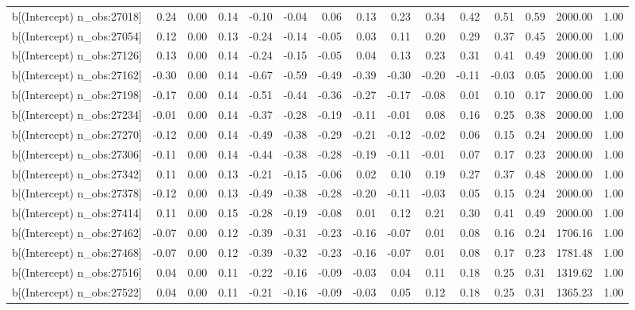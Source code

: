 \begin{table}[ht]
\begin{tabular}{rrrrrrrrrrrrrrr}
  b[(Intercept) n\_obs:27018] & 0.24 & 0.00 & 0.14 & -0.10 & -0.04 & 0.06 & 0.13 & 0.23 & 0.34 & 0.42 & 0.51 & 0.59 & 2000.00 & 1.00 \\ 
  b[(Intercept) n\_obs:27054] & 0.12 & 0.00 & 0.13 & -0.24 & -0.14 & -0.05 & 0.03 & 0.11 & 0.20 & 0.29 & 0.37 & 0.45 & 2000.00 & 1.00 \\ 
  b[(Intercept) n\_obs:27126] & 0.13 & 0.00 & 0.14 & -0.24 & -0.15 & -0.05 & 0.04 & 0.13 & 0.23 & 0.31 & 0.41 & 0.49 & 2000.00 & 1.00 \\ 
  b[(Intercept) n\_obs:27162] & -0.30 & 0.00 & 0.14 & -0.67 & -0.59 & -0.49 & -0.39 & -0.30 & -0.20 & -0.11 & -0.03 & 0.05 & 2000.00 & 1.00 \\ 
  b[(Intercept) n\_obs:27198] & -0.17 & 0.00 & 0.14 & -0.51 & -0.44 & -0.36 & -0.27 & -0.17 & -0.08 & 0.01 & 0.10 & 0.17 & 2000.00 & 1.00 \\ 
  b[(Intercept) n\_obs:27234] & -0.01 & 0.00 & 0.14 & -0.37 & -0.28 & -0.19 & -0.11 & -0.01 & 0.08 & 0.16 & 0.25 & 0.38 & 2000.00 & 1.00 \\ 
  b[(Intercept) n\_obs:27270] & -0.12 & 0.00 & 0.14 & -0.49 & -0.38 & -0.29 & -0.21 & -0.12 & -0.02 & 0.06 & 0.15 & 0.24 & 2000.00 & 1.00 \\ 
  b[(Intercept) n\_obs:27306] & -0.11 & 0.00 & 0.14 & -0.44 & -0.38 & -0.28 & -0.19 & -0.11 & -0.01 & 0.07 & 0.17 & 0.23 & 2000.00 & 1.00 \\ 
  b[(Intercept) n\_obs:27342] & 0.11 & 0.00 & 0.13 & -0.21 & -0.15 & -0.06 & 0.02 & 0.10 & 0.19 & 0.27 & 0.37 & 0.48 & 2000.00 & 1.00 \\ 
  b[(Intercept) n\_obs:27378] & -0.12 & 0.00 & 0.13 & -0.49 & -0.38 & -0.28 & -0.20 & -0.11 & -0.03 & 0.05 & 0.15 & 0.24 & 2000.00 & 1.00 \\ 
  b[(Intercept) n\_obs:27414] & 0.11 & 0.00 & 0.15 & -0.28 & -0.19 & -0.08 & 0.01 & 0.12 & 0.21 & 0.30 & 0.41 & 0.49 & 2000.00 & 1.00 \\ 
  b[(Intercept) n\_obs:27462] & -0.07 & 0.00 & 0.12 & -0.39 & -0.31 & -0.23 & -0.16 & -0.07 & 0.01 & 0.08 & 0.16 & 0.24 & 1706.16 & 1.00 \\ 
  b[(Intercept) n\_obs:27468] & -0.07 & 0.00 & 0.12 & -0.39 & -0.32 & -0.23 & -0.16 & -0.07 & 0.01 & 0.08 & 0.17 & 0.23 & 1781.48 & 1.00 \\ 
  b[(Intercept) n\_obs:27516] & 0.04 & 0.00 & 0.11 & -0.22 & -0.16 & -0.09 & -0.03 & 0.04 & 0.11 & 0.18 & 0.25 & 0.31 & 1319.62 & 1.00 \\ 
  b[(Intercept) n\_obs:27522] & 0.04 & 0.00 & 0.11 & -0.21 & -0.16 & -0.09 & -0.03 & 0.05 & 0.12 & 0.18 & 0.25 & 0.31 & 1365.23 & 1.00 \\ 

\end{tabular}
\end{table}
